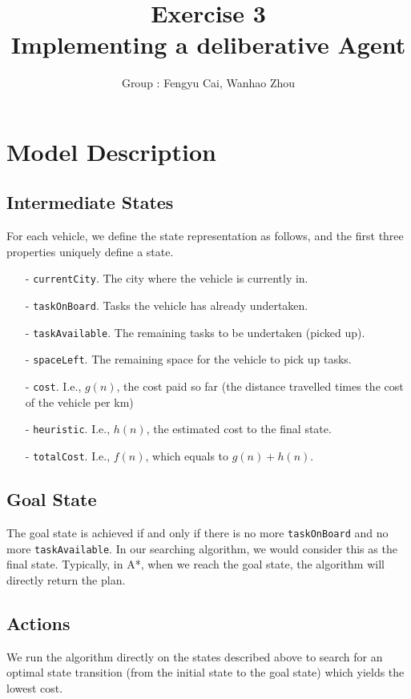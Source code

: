\documentclass[11pt]{article}
\title{\bf Exercise 3\\ Implementing a deliberative Agent}
\author{Group \textnumero 9: Fengyu Cai, Wanhao Zhou}
\begin{document}
\maketitle

\section{Model Description}

\subsection{Intermediate States}
For each vehicle, we define the state representation as follows, and the first three properties uniquely define a state.
\begin{enumerate}
	\item[-] \texttt{currentCity}. The city where the vehicle is currently in.
	\item[-] \texttt{taskOnBoard}. Tasks the vehicle has already undertaken.
	\item[-]	 \texttt{taskAvailable}. The remaining tasks to be undertaken (picked up).
	\item[-] \texttt{spaceLeft}. The remaining space for the vehicle to pick up tasks.
	\item[-]	 \texttt{cost}. I.e., $g(n)$, the cost paid so far (the distance travelled times the cost of the vehicle per km)
	\item[-] \texttt{heuristic}. I.e., $h(n)$, the estimated cost to the final state.
	\item[-] \texttt{totalCost}. I.e., $f(n)$, which equals to $g(n) + h(n)$.
\end{enumerate}

\subsection{Goal State}
The goal state is achieved if and only if there is no more \texttt{taskOnBoard} and no more \texttt{taskAvailable}. In our searching algorithm, we would consider this as the final state. Typically, in A*, when we reach the goal state, the algorithm will directly return the plan.

\subsection{Actions}
We run the algorithm directly on the states described above to search for an optimal state transition (from the initial state to the goal state) which yields the lowest cost. 
\end{document}
